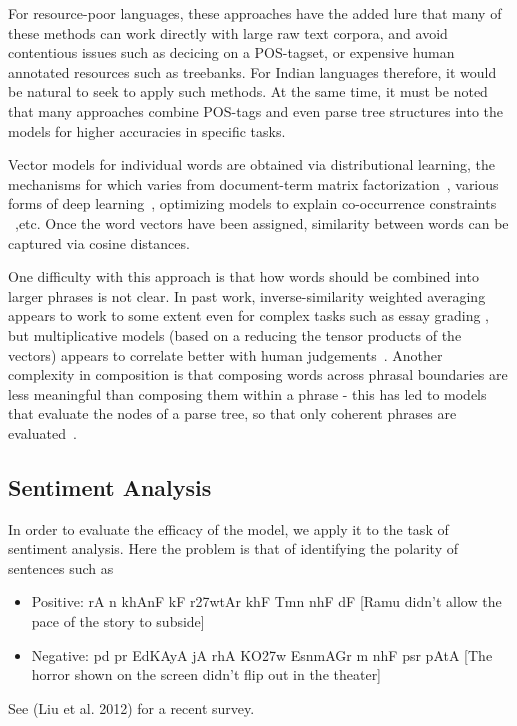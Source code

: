 \def\DevnagVersion{2.15}\documentclass[11pt]{article}
\begin{document}
For resource-poor languages, these approaches have the added lure
that many of these methods can work directly with large raw text corpora,
and avoid contentious issues such as decicing on a POS-tagset, or expensive
human annotated resources such as treebanks.  For Indian languages therefore,
it would be natural to seek to apply such methods.  At the same time, it must
be noted that many approaches combine POS-tags and even parse tree structures
into the models for higher accuracies in specific tasks. 

Vector models for individual words are obtained via distributional learning, the
mechanisms for which varies from document-term
matrix factorization~\cite{Landauer:97},
various forms of deep learning~\cite{Collobert:08,Turian:10,Socher:13}, 
optimizing models to explain co-occurrence constraints
~\cite{Mikolov:13a,Pennington:14},etc. Once the word vectors have been assigned, similarity between words can
be captured via cosine distances. 

One difficulty with this approach is that how words should be
combined into larger phrases is not clear.  In past work,
inverse-similarity weighted averaging appears
to work to some extent even for complex tasks such as essay grading \cite{Landauer:03},
but multiplicative models (based on a reducing the tensor products of the
vectors) appears to correlate better with human
judgements~\cite{Mitchell:08,Socher:13}.
Another complexity in composition is that composing words across phrasal
boundaries are less meaningful than composing them within a phrase - this has
led to models that evaluate the nodes of a parse tree, so that only coherent
phrases are
evaluated~\cite{Socher:13}. 

\subsection{Sentiment Analysis}

In order to evaluate the efficacy of the model, we apply it to the task of
sentiment analysis.
Here the problem is that of identifying the polarity of sentences such as 
\begin{itemize}
\item Positive: {\dn rA n\? khAnF kF r\327wtAr khF{\qva} Tmn\? nhF{\qva} dF} [Ramu didn't allow the pace of the story to subside]
\item Negative: {\dn pd\?{\qvb} pr EdKAyA jA rhA KO\327w Esn\?mAGr m\? nhF{\qva} psr pAtA} [The horror shown on the screen didn't flip out in the theater]
\end{itemize}
See (Liu et al. 2012) for a recent survey.
\end{document}
